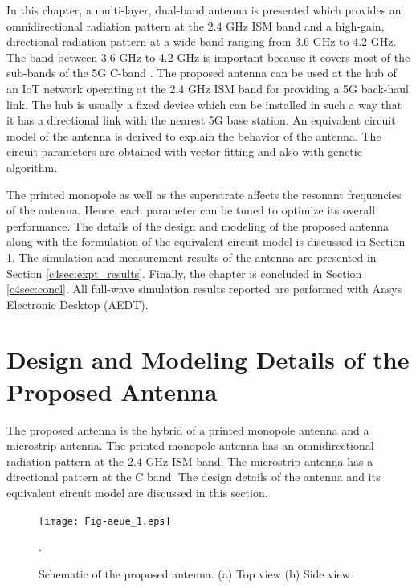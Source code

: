 In this chapter, a multi-layer, dual-band antenna is presented which provides an omnidirectional radiation pattern at the 2.4 GHz ISM band and a high-gain, directional radiation pattern at a wide band ranging from 3.6 GHz to 4.2 GHz. The band between 3.6 GHz to 4.2 GHz is important because it covers most of the sub-bands of the 5G C-band \cite{5G_tutorial, 5G_standards}. The proposed antenna can be used at the hub of an IoT network operating at the 2.4 GHz ISM band for providing a 5G back-haul link. The hub is usually a fixed device which can be installed in such a way that it has a directional link with the nearest 5G base station. An equivalent circuit model of the antenna is derived to explain the behavior of the antenna. The circuit parameters are obtained with vector-fitting and also with genetic algorithm.

The printed monopole as well as the superstrate affects the resonant frequencies of the antenna. Hence, each parameter can be tuned to optimize its overall performance. The details of the design and modeling of the proposed antenna along with the formulation of the equivalent circuit model is discussed in Section \ref{c4sec:design}. The simulation and measurement results of the antenna are presented in Section \ref{c4sec:expt_results}. Finally, the chapter is concluded in Section \ref{c4sec:concl}. All full-wave simulation results reported are performed with Ansys Electronic Desktop (AEDT).
\section{Design and Modeling Details of the Proposed Antenna}\label{c4sec:design}
The proposed antenna is the hybrid of a printed monopole antenna and a microstrip antenna. The printed monopole antenna has an omnidirectional radiation pattern at the 2.4 GHz ISM band. The microstrip antenna has a directional pattern at the C band.
The design details of the antenna and its equivalent circuit model are discussed in this section.

\begin{figure}[t]
\centering
\texttt{[image: Fig-aeue\_1.eps]}
\caption{Schematic of the proposed antenna. (a) Top view (b) Side view}\label{topology}.
\end{figure}

